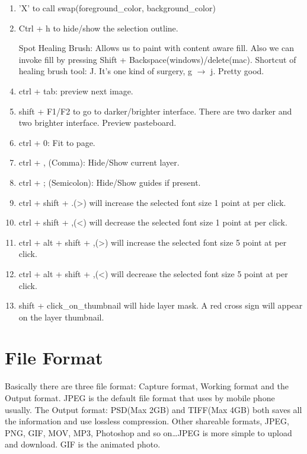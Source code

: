 \documentclass[11 pt]{article}
\begin{document}
\begin{enumerate}
	\item 'X' to call swap(foreground\_color, background\_color)
	\item Ctrl + h to hide/show the selection outline.
	\item[Spot Healing Brush:] Allows us to paint with content aware fill. Also we can invoke fill by pressing Shift + Backspace(windows)/delete(mac). Shortcut of healing brush tool: J. It's one kind of surgery, g $\rightarrow$ j. Pretty good.
	\item ctrl + tab: preview next image.
	\item shift + F1/F2 to go to darker/brighter interface. There are two darker and two brighter interface. Preview pasteboard.
	\item ctrl + 0: Fit to page.
	\item ctrl + , (Comma): Hide/Show current layer.
	\item ctrl + ; (Semicolon): Hide/Show guides if present.
	\item ctrl + shift + .(>) will increase the selected font size 1 point at per click.
	\item ctrl + shift + ,(<) will decrease the selected font size 1 point at per click.
	\item ctrl + alt + shift + ,(>) will increase the selected font size 5 point at per click.
	\item ctrl + alt + shift + ,(<) will decrease the selected font size 5 point at per click.
	\item shift + click\_on\_thumbnail will hide layer mask. A red cross sign will appear on the layer thumbnail.
\end{enumerate}

\section{File Format}
Basically there are three file format: Capture format, Working format and the Output format. JPEG is the default file format that uses by mobile phone usually. The Output format: PSD(Max 2GB) and TIFF(Max 4GB) both saves all the information and use lossless compression. Other shareable formats, JPEG, PNG, GIF, MOV, MP3, Photoshop and so on\dots JPEG is more simple to upload and download. GIF is the animated photo.

\setcounter{section}{10}
\end{document}
